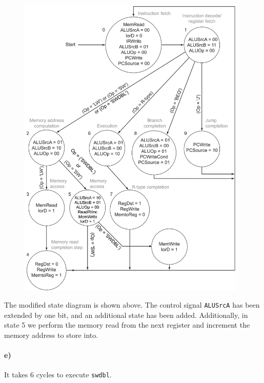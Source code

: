 \documentclass[12pt]{article}
\begin{document}
\begin{figure}[!ht]
    \begin{center}
        \includegraphics[width=4.3in]{problem5d.png}
    \end{center}
\end{figure}

The modified state diagram is shown above. The control signal \texttt{ALUSrcA} has been extended by one bit, and an additional state has been added. Additionally,
in state 5 we perform the memory read from the next register and increment the memory address to store into.

\paragraph{e)}

It takes 6 cycles to execute \texttt{swdbl}.
\end{document}
